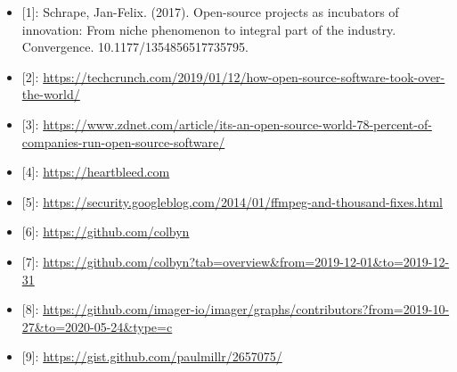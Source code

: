 \documentclass[american, 12pt]{article}
\begin{document}
\begin{itemize}

\item {[}1{]}: Schrape, Jan-Felix. (2017). Open-source projects as incubators of innovation: From niche phenomenon to integral part of the industry. Convergence. 10.1177/1354856517735795. 

\item {[}2{]}: \url{https://techcrunch.com/2019/01/12/how-open-source-software-took-over-the-world/}

\item {[}3{]}: \url{https://www.zdnet.com/article/its-an-open-source-world-78-percent-of-companies-run-open-source-software/}

\item {[}4{]}: \url{https://heartbleed.com}

\item {[}5{]}: \url{https://security.googleblog.com/2014/01/ffmpeg-and-thousand-fixes.html}

\item {[}6{]}: \url{https://github.com/colbyn }

\item {[}7{]}: \url{https://github.com/colbyn?tab=overview&from=2019-12-01&to=2019-12-31}

\item {[}8{]}: \url{https://github.com/imager-io/imager/graphs/contributors?from=2019-10-27&to=2020-05-24&type=c}

\item {[}9{]}: \url{https://gist.github.com/paulmillr/2657075/}

\end{itemize}
\end{document}
